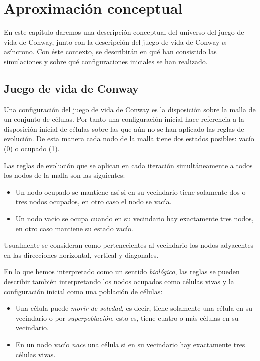 \documentclass[../proyecto.tex]{memoir}
\begin{document}
\chapter{Aproximación conceptual}

En este capítulo daremos una descripción conceptual del universo del juego de vida de Conway, junto con la descripción del juego de vida de Conway $\alpha$-asíncrono. Con éste contexto, se describirán en qué han consistido las simulaciones y sobre qué configuraciones iniciales se han realizado.

\section{Juego de vida de Conway}

Una configuración del juego de vida de Conway es la disposición sobre la malla de un conjunto de células. Por tanto una configuración inicial hace referencia a la disposición inicial de células sobre las que aún no se han aplicado las reglas de evolución. De esta manera cada nodo de la malla tiene dos estados posibles: vacío (0) o  ocupado (1). 

Las reglas de evolución que se aplican en cada iteración simultáneamente a todos los nodos de la malla son las siguientes:
\begin{itemize}
\item Un nodo ocupado se mantiene así si en su vecindario tiene solamente dos o tres nodos ocupados, en otro caso el nodo se vacía.
\item Un nodo vacío se ocupa cuando en su vecindario hay exactamente tres nodos, en otro caso mantiene su estado vacío.
\end{itemize}
Usualmente se consideran como pertenecientes al vecindario los nodos adyacentes en las direcciones horizontal, vertical y diagonales. 

En lo que hemos interpretado como un sentido \textit{biológico}, las reglas se pueden describir también interpretando los nodos ocupados como células vivas y la configuración inicial como una población de células:
\begin{itemize}
\item Una célula puede \textit{morir de soledad}, es decir, tiene solamente una célula en su vecindario o por \textit{superpoblación}, esto es, tiene cuatro o más células en su vecindario.
\item En un nodo vacío \textit{nace} una célula si en su vecindario hay exactamente tres células vivas.
\end{itemize}
\end{document}
